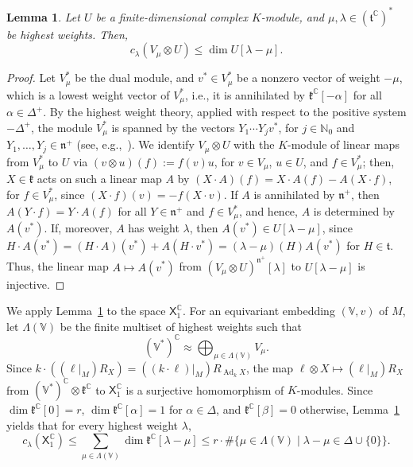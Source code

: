 \documentclass{article}
\newcommand{\N}{\mathbb{N}}
\newcommand{\C}{\mathbb{C}}
\newcommand{\frakk}{\mathfrak{k}}
\newcommand{\frakt}{\mathfrak{t}}
\newcommand{\frakn}{\mathfrak{n}}
\newcommand{\sX}{\mathsf{X}}
\newtheorem{lemma}{Lemma}
\theoremstyle{definition}
\theoremstyle{plain}
\begin{document}
\begin{lemma}\label{lem:multiplicity}
Let $U$ be a finite-dimensional complex $K$-module, and $\mu,\lambda\in(\frakt^\C)^*$ be highest weights.  Then,
$$
c_\lambda(V_\mu\otimes U)\leq\dim U[\lambda-\mu].
$$
\end{lemma}

\begin{proof}
Let $V_\mu^*$ be the dual module, and $v^*\in V_\mu^*$ be a nonzero vector of weight $-\mu$, which is a lowest weight vector of $V_\mu^*$, i.e., it is annihilated by $\frakk^\C[-\alpha]$ for all $\alpha\in\Delta^+$.
By the highest weight theory, applied with respect to the positive system $-\Delta^+$, the module $V_\mu^*$ is spanned by the vectors $Y_1\cdots Y_jv^*$, for $j\in\N_0$ and $Y_1,\ldots,Y_j \in \frakn^+$ (see, e.g.,~\cite[Section~20.2]{HumphreysLie}).
We identify $V_\mu\otimes U$ with the $K$-module of linear maps from $V_\mu^*$ to $U$ via $(v\otimes u)(f):=f(v)u$, for $v\in V_\mu$, $u\in U$, and $f\in V_\mu^*$; 
then, $X\in\frakk$ acts on such a linear map $A$ by $(X\cdot A)(f)=X\cdot A(f)-A(X\cdot f)$, for $f\in V_\mu^*$, since $(X\cdot f)(v)=-f(X\cdot v)$.
If $A$ is annihilated by $\frakn^+$, then $A(Y\cdot f)=Y\cdot A(f)$ for all $Y\in\frakn^+$ and $f\in V_\mu^*$, and hence, $A$ is determined by $A(v^*)$.
If, moreover, $A$ has weight $\lambda$, then $A(v^*)\in U[\lambda-\mu]$, since $H\cdot A(v^*)=(H\cdot A)(v^*)+A(H\cdot v^*)=(\lambda-\mu)(H)A(v^*)$ for $H\in\frakt$.
Thus, the linear map $A\mapsto A(v^*)$ from $(V_\mu\otimes U)^{\frakn^+}[\lambda]$ to $U[\lambda-\mu]$ is injective.
\end{proof}

We apply Lemma~\ref{lem:multiplicity} to the space $\sX_1^\C$.
For an equivariant embedding $(\mathbb V,v)$ of $M$, let $\Lambda(\mathbb V)$ be the finite multiset of highest weights such that
$$
  (\mathbb V^*)^\C\approx\bigoplus_{\mu\in\Lambda(\mathbb V)}V_\mu.
$$
Since $k\cdot((\ell|_M)R_X)=((k\cdot\ell)|_M)R_{\operatorname{Ad}_kX}$, the map $\ell\otimes X\mapsto(\ell|_M)R_X$ from $(\mathbb V^*)^\C\otimes\frakk^\C$ to $\sX_1^\C$ is a surjective homomorphism of $K$-modules.
Since $\dim\frakk^\C[0]=r$, $\dim\frakk^\C[\alpha]=1$ for $\alpha\in\Delta$, and $\frakk^\C[\beta]=0$ otherwise, Lemma~\ref{lem:multiplicity} yields that for every highest weight $\lambda$,
\begin{equation}\label{eq:multiplicity-bound}
c_\lambda(\sX_1^\C)\leq\sum_{\mu\in\Lambda(\mathbb V)}\dim\frakk^\C[\lambda-\mu]
\leq r\cdot\#\{\mu\in\Lambda(\mathbb V)\mid\lambda-\mu\in\Delta\cup\{0\}\}.
\end{equation}
\end{document}
